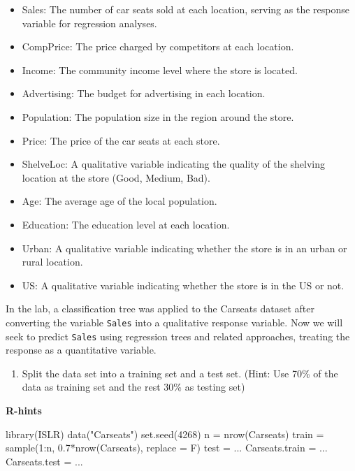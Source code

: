 \documentclass[
]{article}
\newenvironment{Shaded}{\begin{snugshade}}{\end{snugshade}}
\newcommand{\AttributeTok}[1]{\textcolor[rgb]{0.77,0.63,0.00}{#1}}
\newcommand{\DecValTok}[1]{\textcolor[rgb]{0.00,0.00,0.81}{#1}}
\newcommand{\FloatTok}[1]{\textcolor[rgb]{0.00,0.00,0.81}{#1}}
\newcommand{\FunctionTok}[1]{\textcolor[rgb]{0.00,0.00,0.00}{#1}}
\newcommand{\NormalTok}[1]{#1}
\newcommand{\OtherTok}[1]{\textcolor[rgb]{0.56,0.35,0.01}{#1}}
\newcommand{\SpecialCharTok}[1]{\textcolor[rgb]{0.00,0.00,0.00}{#1}}
\newcommand{\StringTok}[1]{\textcolor[rgb]{0.31,0.60,0.02}{#1}}
\providecommand{\tightlist}{%
  \setlength{\itemsep}{0pt}\setlength{\parskip}{0pt}}
\begin{document}
\begin{itemize}
\tightlist
\item
  Sales: The number of car seats sold at each location, serving as the
  response variable for regression analyses.
\item
  CompPrice: The price charged by competitors at each location.
\item
  Income: The community income level where the store is located.
\item
  Advertising: The budget for advertising in each location.
\item
  Population: The population size in the region around the store.
\item
  Price: The price of the car seats at each store.
\item
  ShelveLoc: A qualitative variable indicating the quality of the
  shelving location at the store (Good, Medium, Bad).
\item
  Age: The average age of the local population.
\item
  Education: The education level at each location.
\item
  Urban: A qualitative variable indicating whether the store is in an
  urban or rural location.
\item
  US: A qualitative variable indicating whether the store is in the US
  or not.
\end{itemize}

In the lab, a classification tree was applied to the Carseats dataset
after converting the variable \texttt{Sales} into a qualitative response
variable. Now we will seek to predict \texttt{Sales} using regression
trees and related approaches, treating the response as a quantitative
variable.

\begin{enumerate}
\def\labelenumi{\alph{enumi})}
\tightlist
\item
  Split the data set into a training set and a test set. (Hint: Use 70\%
  of the data as training set and the rest 30\% as testing set)
\end{enumerate}

\textbf{R-hints}

\begin{Shaded}
\begin{Highlighting}[]
\FunctionTok{library}\NormalTok{(ISLR)}
\FunctionTok{data}\NormalTok{(}\StringTok{"Carseats"}\NormalTok{)}
\FunctionTok{set.seed}\NormalTok{(}\DecValTok{4268}\NormalTok{)}
\NormalTok{n }\OtherTok{=} \FunctionTok{nrow}\NormalTok{(Carseats)}
\NormalTok{train }\OtherTok{=} \FunctionTok{sample}\NormalTok{(}\DecValTok{1}\SpecialCharTok{:}\NormalTok{n, }\FloatTok{0.7}\SpecialCharTok{*}\FunctionTok{nrow}\NormalTok{(Carseats), }\AttributeTok{replace =}\NormalTok{ F)}
\NormalTok{test }\OtherTok{=}\NormalTok{ ...}
\NormalTok{Carseats.train }\OtherTok{=}\NormalTok{ ...}
\NormalTok{Carseats.test }\OtherTok{=}\NormalTok{ ...}
\end{Highlighting}
\end{Shaded}
\end{document}
